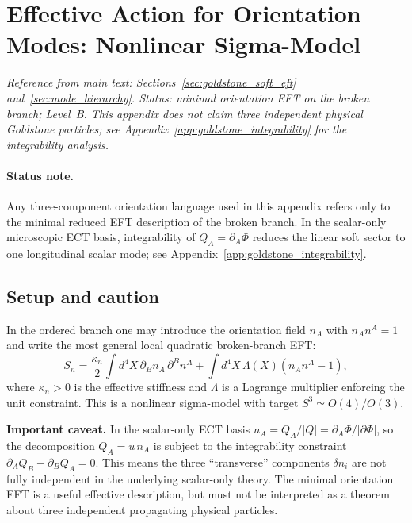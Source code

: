 \documentclass[11pt,a4paper]{article}
\numberwithin{equation}{section}
\begin{document}
\section{Effective Action for Orientation Modes: Nonlinear Sigma-Model}
\label{app:sigma_model}

\textit{Reference from main text:
Sections~\ref{sec:goldstone_soft_eft} and~\ref{sec:mode_hierarchy}.
Status: minimal orientation EFT on the broken branch; Level~B.
This appendix does not claim three independent physical Goldstone particles;
see Appendix~\ref{app:goldstone_integrability} for the integrability analysis.}

\paragraph{Status note.}
Any three-component orientation language used in this appendix refers
only to the minimal reduced EFT description of the broken branch.
In the scalar-only microscopic ECT basis, integrability of
$Q_A=\partial_A\Phi$ reduces the linear soft sector to one longitudinal
scalar mode; see Appendix~\ref{app:goldstone_integrability}.

\subsection*{Setup and caution}

In the ordered branch one may introduce the orientation field $n_A$ with
$n_A n^A=1$ and write the most general local quadratic broken-branch EFT:
\begin{equation}
  \label{eq:sigma_model}
  S_n = \frac{\kappa_n}{2}\int d^4X\,\partial_B n_A\,\partial^B n^A
  + \int d^4X\,\Lambda(X)(n_A n^A-1),
\end{equation}
where $\kappa_n>0$ is the effective stiffness and $\Lambda$ is a
Lagrange multiplier enforcing the unit constraint.
This is a nonlinear sigma-model with target $S^3\simeq O(4)/O(3)$.

\textbf{Important caveat.}
In the scalar-only ECT basis $n_A = Q_A/|Q| = \partial_A\Phi/|\partial\Phi|$,
so the decomposition $Q_A=u\,n_A$ is subject to the integrability
constraint $\partial_A Q_B-\partial_B Q_A=0$.
This means the three ``transverse'' components $\delta n_i$ are not
fully independent in the underlying scalar-only theory.
The minimal orientation EFT is a useful effective description, but must
not be interpreted as a theorem about three independent propagating
physical particles.
\end{document}
